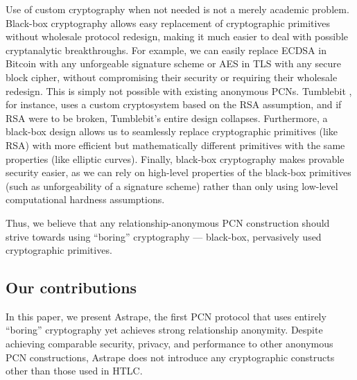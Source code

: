 \documentclass[USenglish,oneside,twocolumn]{article}
\begin{document}
Use of custom cryptography when not needed is not a merely academic problem. Black-box cryptography allows easy replacement of cryptographic primitives without wholesale protocol redesign, making it much easier to deal with possible cryptanalytic breakthroughs. For example, we can easily replace ECDSA in Bitcoin with any unforgeable signature scheme or AES in TLS with any secure block cipher, without compromising their security or requiring their wholesale redesign. This is simply not possible with existing anonymous PCNs. Tumblebit \cite{heilman2017tumblebit}, for instance, uses a custom cryptosystem based on the RSA assumption, and if RSA were to be broken, Tumblebit's entire design collapses. Furthermore, a black-box design allows us to seamlessly replace cryptographic primitives (like RSA) with more efficient but mathematically different primitives  with the same properties (like elliptic curves). Finally, black-box cryptography makes provable security easier, as we can rely on high-level properties of the black-box primitives (such as unforgeability of a signature scheme) rather than only using low-level computational hardness assumptions.

Thus, we believe that any relationship-anonymous PCN construction should strive towards using ``boring'' cryptography --- black-box, pervasively used cryptographic primitives.

\subsection{Our contributions}

In this paper, we present Astrape, the first PCN protocol that uses entirely ``boring'' cryptography yet achieves strong relationship anonymity. Despite achieving comparable security, privacy, and performance to other anonymous PCN constructions, Astrape does not introduce any cryptographic constructs other than those used in HTLC.
\end{document}

